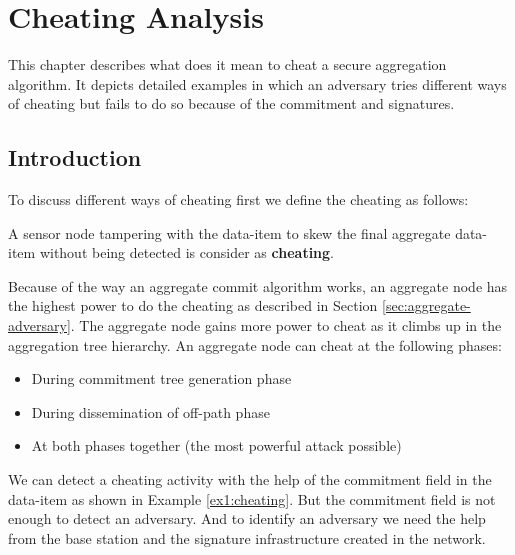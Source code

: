 \chapter{Cheating Analysis}
	
	This chapter describes what does it mean to cheat a secure aggregation algorithm.
	It depicts detailed examples in which an adversary tries different ways of cheating but fails to do so because of the commitment and signatures.

	\section{Introduction}
 	To discuss different ways of cheating first we define the cheating as follows:
	\begin{definition}
		A sensor node tampering with the data-item to skew the final aggregate data-item without being detected is consider as \textbf{cheating}.	
	\end{definition}
	Because of the way an aggregate commit algorithm works, an aggregate node has the highest power to do the cheating as described in Section \ref{sec:aggregate-adversary}. 
	The aggregate node gains more power to cheat as it climbs up in the aggregation tree hierarchy.
	An aggregate node can cheat at the following phases:
	\begin{itemize}
		\item During commitment tree generation phase
		\item During dissemination of off-path phase
		\item At both phases together (the most powerful attack possible) 
	\end{itemize}
	We can detect a cheating activity with the help of the commitment field in the data-item as shown in Example \ref{ex1:cheating}.
	But the commitment field is not enough to detect an adversary.
	And to identify an adversary we need the help from the base station and the signature infrastructure created in the network.


